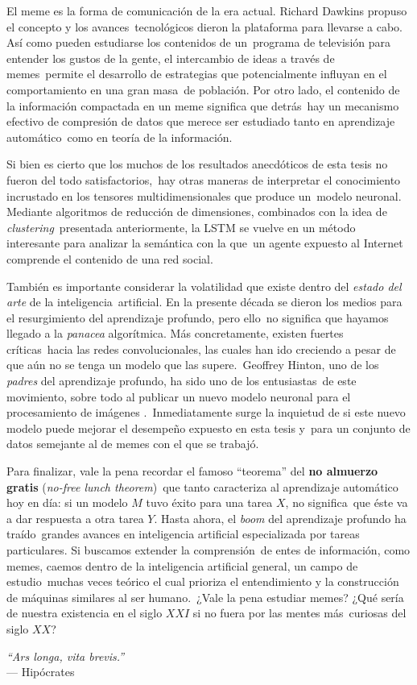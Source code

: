 El meme es la forma de comunicación de la era actual. Richard Dawkins propuso el concepto y los avances\
tecnológicos dieron la plataforma para llevarse a cabo. Así como pueden estudiarse los contenidos de un\
programa de televisión para entender los gustos de la gente, el intercambio de ideas a través de memes\
permite el desarrollo de estrategias que potencialmente influyan en el comportamiento en una gran masa\
de población. Por otro lado, el contenido de la información compactada en un meme significa que detrás\
hay un mecanismo efectivo de compresión de datos que merece ser estudiado tanto en aprendizaje automático\
como en teoría de la información.\par
Si bien es cierto que los muchos de los resultados anecdóticos de esta tesis no fueron del todo satisfactorios,\
hay otras maneras de interpretar el conocimiento incrustado en los tensores multidimensionales que produce un\
modelo neuronal. Mediante algoritmos de reducción de dimensiones, combinados con la idea de \emph{clustering}\
presentada anteriormente, la LSTM se vuelve en un método interesante para analizar la semántica con la que\
un agente expuesto al Internet comprende el contenido de una red social.\par
También es importante considerar la volatilidad que existe dentro del \emph{estado del arte} de la inteligencia\
artificial. En la presente década se dieron los medios para el resurgimiento del aprendizaje profundo, pero ello\
no significa que hayamos llegado a la \emph{panacea} algorítmica. Más concretamente, existen fuertes críticas\
hacia las redes convolucionales, las cuales han ido creciendo a pesar de que aún no se tenga un modelo que las supere.\
Geoffrey Hinton, uno de los \emph{padres} del aprendizaje profundo, ha sido uno de los entusiastas\
de este movimiento, sobre todo al publicar un nuevo modelo neuronal para el procesamiento de imágenes \cite{2017arXiv171009829S}.\
Inmediatamente surge la inquietud de si este nuevo modelo puede mejorar el desempeño expuesto en esta tesis y\
para un conjunto de datos semejante al de memes con el que se trabajó.\par
Para finalizar, vale la pena recordar el famoso ``teorema'' del \textbf{no almuerzo gratis} (\emph{no-free lunch theorem})\
que tanto caracteriza al aprendizaje automático hoy en día: si un modelo $M$ tuvo éxito para una tarea $X$, no significa\
que éste va a dar respuesta a otra tarea $Y$. Hasta ahora, el \emph{boom} del aprendizaje profundo ha traído\
grandes avances en inteligencia artificial especializada por tareas particulares. Si buscamos extender la comprensión\
de entes de información, como memes, caemos dentro de la inteligencia artificial general, un campo de estudio\
muchas veces teórico el cual prioriza el entendimiento y la construcción de máquinas similares al ser humano.\
¿Vale la pena estudiar memes? ¿Qué sería de nuestra existencia en el siglo $XXI$ si no fuera por las mentes más\
curiosas del siglo $XX$?\par
\begin{center}
  \emph{``Ars longa, vita brevis.''}
  \\[5pt]
  --- Hipócrates
\end{center}

\newpage
